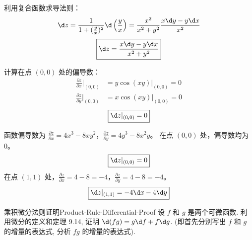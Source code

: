 \begin{solution}
    利用复合函数求导法则：
    \begin{equation}
        \d z = \frac{1}{1 + (\frac{y}{x})^2} \d \left( \frac{y}{x} \right) = \frac{x^2}{x^2 + y^2} \frac{x \d y - y \d x}{x^2}
    \end{equation}
    \begin{equation}
        \boxed{\d z = \frac{x \d y - y \d x}{x^2 + y^2}}
    \end{equation}

    计算在点 $(0,0)$ 处的偏导数：
    \begin{equation}
        \begin{aligned}
            \frac{\partial z}{\partial x}\bigg|_{(0,0)} & = y \cos(xy) \bigg|_{(0,0)} = 0 \\
            \frac{\partial z}{\partial y}\bigg|_{(0,0)} & = x \cos(xy) \bigg|_{(0,0)} = 0
        \end{aligned}
    \end{equation}
    \begin{equation}
        \boxed{\d z|_{(0,0)} = 0}
    \end{equation}

    函数偏导数为 $\frac{\partial z}{\partial x} = 4x^3 - 8xy^2$，$\frac{\partial z}{\partial y} = 4y^3 - 8x^2y$。
    在点 $(0,0)$ 处，偏导数均为 $0$。
    \begin{equation}
        \boxed{\d z|_{(0,0)} = 0}
    \end{equation}
    在点 $(1,1)$ 处，$\frac{\partial z}{\partial x} = 4 - 8 = -4$，$\frac{\partial z}{\partial y} = 4 - 8 = -4$。
    \begin{equation}
        \boxed{\d z|_{(1,1)} = -4 \d x - 4 \d y}
    \end{equation}
\end{solution}

\begin{problem}{乘积微分法则证明}{Product-Rule-Differential-Proof}
    设 $f$ 和 $g$ 是两个可微函数. 利用微分的定义和定理 9.14, 证明 $\d(fg) = g \d f + f \d g$. (即首先分别写出 $f$ 和 $g$ 的增量的表达式, 分析 $fg$ 的增量的表达式).
\end{problem}

